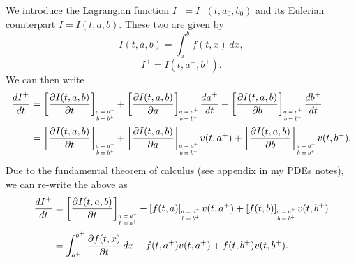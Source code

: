 \documentclass[oneside,a4paper,11pt]{report}
\begin{document}
We introduce the Lagrangian function $I^+ = I^+(t,a_0,b_0)$ and its Eulerian counterpart $I = I(t,a,b)$. These two are given by 
\begin{equation}
    I(t,a,b) = \int_a^b f(t,x) \, dx,
\end{equation}
\begin{equation}
    I^+ = I(t,a^+,b^+).
\end{equation}
We can then write
\begin{align}
    \frac{dI^+}{dt} &= \left [ \frac{\partial I(t,a,b)}{\partial t} \right ]_{\scaleto{\begin{matrix} a=a^+ \\b=b^+ \end{matrix}}{15pt}} + \left [ \frac{\partial I(t,a,b)}{\partial a} \right ]_{\scaleto{\begin{matrix} a=a^+ \\b=b^+ \end{matrix}}{15pt}} \frac{d a^+}{dt} + \left [ \frac{\partial I(t,a,b)}{\partial b} \right ]_{\scaleto{\begin{matrix} a=a^+ \\b=b^+ \end{matrix}}{15pt}} \frac{db^+}{dt} \\
    &= \left [ \frac{\partial I(t,a,b)}{\partial t} \right ]_{\scaleto{\begin{matrix} a=a^+ \\b=b^+ \end{matrix}}{15pt}} + \left [ \frac{\partial I(t,a,b)}{\partial a} \right ]_{\scaleto{\begin{matrix} a=a^+ \\b=b^+ \end{matrix}}{15pt}} v(t,a^+) + \left [ \frac{\partial I(t,a,b)}{\partial b}\right ]_{\scaleto{\begin{matrix} a=a^+ \\b=b^+ \end{matrix}}{15pt}} v(t,b^+).
\end{align}
Due to the fundamental theorem of calculus (see appendix in my PDEs notes), we can re-write the above as
\begin{align}
    \frac{dI^+}{dt} &= \left [ \frac{\partial I(t,a,b)}{\partial t} \right ]_{\scaleto{\begin{matrix} a=a^+ \\b=b^+ \end{matrix}}{15pt}} -\left [ f(t,a) \right ]_{\scaleto{\begin{matrix} a=a^+ \\b=b^+ \end{matrix}}{15pt}} v(t,a^+) + \left [ f(t,b) \right ]_{\scaleto{\begin{matrix} a=a^+ \\b=b^+ \end{matrix}}{15pt}} v(t,b^+) \nonumber \\
    &= \int_{a^+}^{b^+} \frac{\partial f(t,x)}{\partial t} \, dx - f(t,a^+) v(t,a^+) + f(t,b^+) v(t,b^+).
\end{align}
\end{document}
